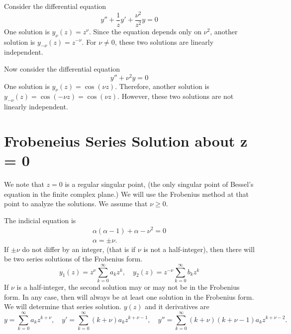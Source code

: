 \begin{Example}
  Consider the differential equation
  \[
  y'' + \frac{1}{z} y' + \frac{\nu^2}{z^2} y = 0
  \]
  One solution is $y_\nu(z) = z^\nu$.  Since the equation depends only 
  on $\nu^2$, another solution is $y_{-\nu}(z) = z^{-\nu}$.  For 
  $\nu \neq 0$, these two solutions are linearly independent.

  Now consider the differential equation
  \[
  y'' + \nu^2 y = 0
  \]
  One solution is $y_\nu(z) = \cos(\nu z)$.  Therefore,
  another solution is $y_{-\nu}(z) = \cos(-\nu z) = \cos(\nu z)$.
  However, these two solutions are not linearly independent.
\end{Example}





\section{Frobeneius Series Solution about z = 0}

We note that $z=0$ is a regular singular point, (the only
singular point of Bessel's equation in the finite complex plane.)  
We will use the Frobenius method at that point to analyze the solutions.
We assume that $\nu \geq 0$.

The indicial equation is 
\begin{gather*}
  \alpha(\alpha-1) + \alpha - \nu^2 = 0 \\
  \alpha = \pm \nu.
\end{gather*}
If $\pm \nu$ do not differ by an integer, (that is if $\nu$ is not a 
half-integer), then there will be two series solutions of the Frobenius 
form.
\[
y_1(z) = z^\nu \sum_{k = 0}^\infty a_k z^k, 
\quad
y_2(z) = z^{-\nu} \sum_{k = 0}^\infty b_k z^k 
\]
If $\nu$ is a half-integer, the second solution may or may not be in the
Frobenius form.  In any case, then will always be at least one solution 
in the Frobenius form.  We will determine that series solution.
$y(z)$ and it derivatives are
\[
y = \sum_{k = 0}^\infty a_k z^{k+\nu}, \quad
y' = \sum_{k = 0}^\infty (k + \nu) a_k z^{k+\nu-1}, \quad
y'' = \sum_{k = 0}^\infty (k + \nu)(k + \nu - 1) a_k z^{k+\nu-2}.
\]

